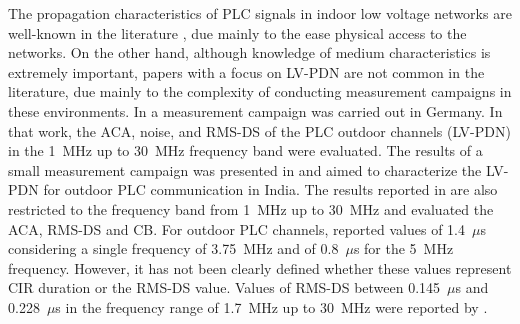 \documentclass[journal]{IEEEtran}
\begin{document}
The propagation characteristics of \ac{PLC} signals in indoor low voltage networks are well-known in the literature \cite{Zimmermann2002, Tlich2008, Tlich2008a, Tonello2014}, due mainly to the ease physical access to the networks. On the other hand, although knowledge of medium characteristics is extremely important, papers with a focus on \ac{LV-PDN} are not common in the literature, due mainly to the complexity of conducting measurement campaigns in these environments. In \cite{Liu2000} a measurement campaign was carried out in Germany. In that work, the \ac{ACA}, noise, and \ac{RMS-DS} of the \ac{PLC} outdoor channels (\ac{LV-PDN}) in the 1~MHz up to 30~MHz frequency band were evaluated. The results of a small measurement campaign was presented in \cite{Prasad2001} and aimed to characterize the \ac{LV-PDN} for outdoor \ac{PLC} communication in India. The results reported in \cite{Prasad2001} are also restricted to the frequency band from 1~MHz up to 30~MHz and evaluated the \ac{ACA}, \ac{RMS-DS} and \ac{CB}. For outdoor \ac{PLC} channels, \cite{Liu2000} reported values of 1.4~$\mu$s  considering a single frequency of 3.75~MHz and of 0.8~$\mu$s for the 5~MHz frequency. However, it has not been clearly defined whether these values represent \ac{CIR} duration or the \ac{RMS-DS} value. Values of \ac{RMS-DS} between 0.145~$\mu$s and 0.228~$\mu$s in the frequency range of 1.7~MHz up to 30~MHz were reported by \cite{Prasad2001}.
\end{document}
